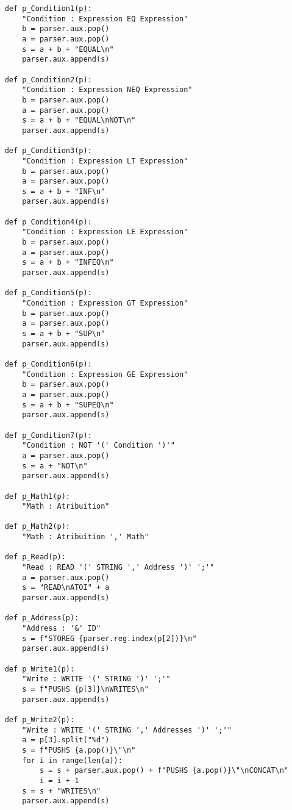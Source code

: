 \documentclass[12pt,a4paper]{report}
\begin{document}
\begin{lstlisting}
    def p_Condition1(p):
        "Condition : Expression EQ Expression"
        b = parser.aux.pop()
        a = parser.aux.pop()
        s = a + b + "EQUAL\n"
        parser.aux.append(s)
    
    def p_Condition2(p):
        "Condition : Expression NEQ Expression"
        b = parser.aux.pop()
        a = parser.aux.pop()
        s = a + b + "EQUAL\nNOT\n"
        parser.aux.append(s)
    
    def p_Condition3(p):
        "Condition : Expression LT Expression"
        b = parser.aux.pop()
        a = parser.aux.pop()
        s = a + b + "INF\n"
        parser.aux.append(s)
    
    def p_Condition4(p):
        "Condition : Expression LE Expression"
        b = parser.aux.pop()
        a = parser.aux.pop()
        s = a + b + "INFEQ\n"
        parser.aux.append(s)
    
    def p_Condition5(p):
        "Condition : Expression GT Expression"
        b = parser.aux.pop()
        a = parser.aux.pop()
        s = a + b + "SUP\n"
        parser.aux.append(s)
    
    def p_Condition6(p):
        "Condition : Expression GE Expression"
        b = parser.aux.pop()
        a = parser.aux.pop()
        s = a + b + "SUPEQ\n"
        parser.aux.append(s)
    
    def p_Condition7(p):
        "Condition : NOT '(' Condition ')'"
        a = parser.aux.pop()
        s = a + "NOT\n"
        parser.aux.append(s)
        
    def p_Math1(p):
        "Math : Atribuition"
    
    def p_Math2(p):
        "Math : Atribuition ',' Math"
    
    def p_Read(p):
        "Read : READ '(' STRING ',' Address ')' ';'"
        a = parser.aux.pop()
        s = "READ\nATOI" + a
        parser.aux.append(s)
    
    def p_Address(p):
        "Address : '&' ID"
        s = f"STOREG {parser.reg.index(p[2])}\n"
        parser.aux.append(s)
    
    def p_Write1(p):
        "Write : WRITE '(' STRING ')' ';'"
        s = f"PUSHS {p[3]}\nWRITES\n"
        parser.aux.append(s)
    
    def p_Write2(p):
        "Write : WRITE '(' STRING ',' Addresses ')' ';'"
        a = p[3].split("%d")
        s = f"PUSHS {a.pop()}\"\n"
        for i in range(len(a)):
            s = s + parser.aux.pop() + f"PUSHS {a.pop()}\"\nCONCAT\n"
            i = i + 1
        s = s + "WRITES\n"
        parser.aux.append(s)
    

\end{lstlisting}
\end{document}
